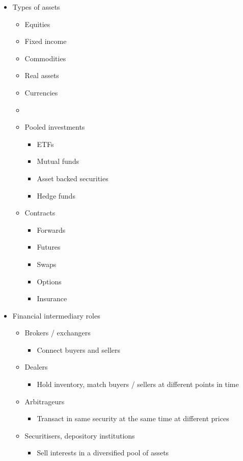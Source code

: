 \documentclass[../notes_compiled.tex]{subfiles}
\begin{document}
\begin{itemize}
\item Types of assets
\begin{multicols}{3}
\begin{itemize}
\item Equities
\item Fixed income
\item Commodities
\item Real assets
\item Currencies
\item[]
\item Pooled investments
\begin{itemize}
\item ETFs
\item Mutual funds
\item Asset backed securities
\item Hedge funds
\end{itemize}
\item Contracts
\begin{itemize}
\item Forwards
\item Futures
\item Swaps
\item Options
\item Insurance
\end{itemize}
\end{itemize}
\end{multicols}

\item Financial intermediary roles
\begin{itemize}
\item Brokers / exchangers
\begin{itemize}
\item Connect buyers and sellers
\end{itemize}

\item Dealers
\begin{itemize}
\item Hold inventory, match buyers / sellers at different points in time
\end{itemize}

\item Arbitrageurs
\begin{itemize}
\item Transact in same security at the same time at different prices
\end{itemize}

\item Securitisers, depository institutions
\begin{itemize}
\item Sell interests in a diversified pool of assets
\end{itemize}


\end{itemize}
\end{itemize}
\end{document}
